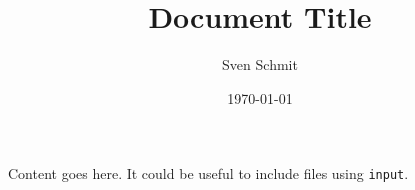 \title{Document Title}
\author{Sven Schmit}
\date{\today}



    \maketitle

    Content goes here. It could be useful to include files using
    \texttt{input}.

    
    


